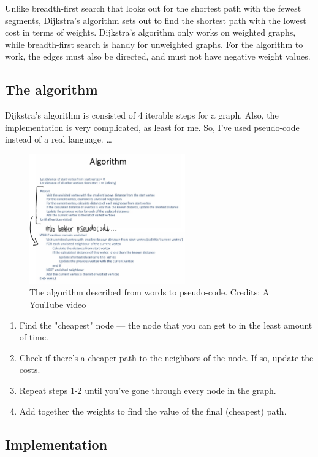 \documentclass{article}
\begin{document}
Unlike breadth-first search that looks out for the shortest path with the fewest segments, Dijkstra's algorithm sets out to find the shortest path with the lowest cost in terms of weights. Dijkstra's algorithm only works on weighted graphs, while breadth-first search is handy for unweighted graphs. For the algorithm to work, the edges must also be directed, and must not have negative weight values.

\subsection{The algorithm}

Dijkstra's algorithm is consisted of 4 iterable steps for a graph. Also, the implementation is very complicated, as least for me. So, I've used pseudo-code instead of a real language. \dots

\begin{figure}
    \centering
    \includegraphics[width=0.6\textwidth]{algo.png}
    \caption{The algorithm described from words to pseudo-code. Credits: A YouTube video}
    \label{fig:my_label}
\end{figure}

\begin{enumerate}
    \item Find the "cheapest" node — the node that you can get to in the least amount of time.
    \item Check if there's a cheaper path to the neighbors of the node. If so, update the costs.
    \item Repeat steps 1-2 until you've gone through every node in the graph.
    \item Add together the weights to find the value of the final (cheapest) path.
\end{enumerate}

\subsection{Implementation}
\end{document}
